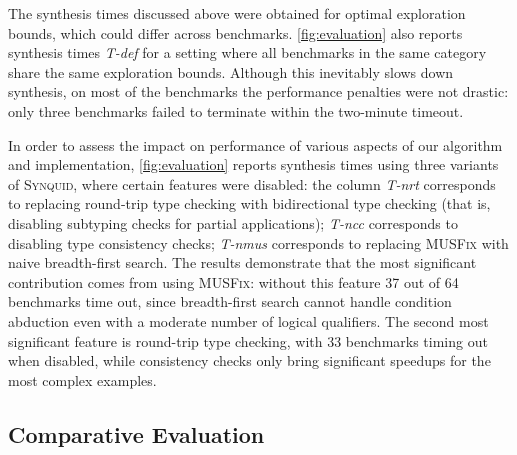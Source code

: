 \documentclass[10pt,preprint]{sigplanconf-pldi16}
\theoremstyle{definition}
\newcommand{\tool}{\textsc{Synquid}\xspace}
\newcommand{\exCount}{64\xspace}
\begin{document}
The synthesis times discussed above were obtained for optimal exploration bounds, which could differ across benchmarks.
\autoref{fig:evaluation} also reports synthesis times \emph{T-def} for a setting
where all benchmarks in the same category share the same exploration bounds. 
Although this inevitably slows down synthesis, on most of the benchmarks the performance penalties were not drastic: 
only three benchmarks failed to terminate within the two-minute timeout.

In order to assess the impact on performance of various aspects of our algorithm and implementation,
\autoref{fig:evaluation} reports synthesis times using three variants of \tool, where certain features were disabled:
the column \emph{T-nrt} corresponds to replacing round-trip type checking with bidirectional type checking
(that is, disabling subtyping checks for partial applications);
\emph{T-ncc} corresponds to disabling type consistency checks;
\emph{T-nmus} corresponds to replacing \textsc{MUSFix} with naive breadth-first search.
The results demonstrate that the most significant contribution comes from using \textsc{MUSFix}:
without this feature 37 out of \exCount benchmarks time out,
since breadth-first search cannot handle condition abduction even with a moderate number of logical qualifiers.
The second most significant feature is round-trip type checking, with 33 benchmarks timing out when disabled,
while consistency checks only bring significant speedups for the most complex examples.


\subsection{Comparative Evaluation}\label{sec:eval:comparative}
\end{document}
